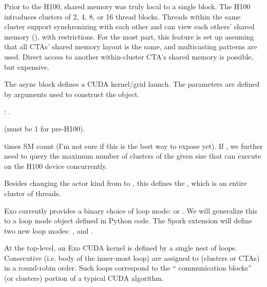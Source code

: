 \filbreak
{}

Prior to the H100, shared memory was truly local to a single block.
The H100 introduces clusters of 2, 4, 8, or 16 thread blocks.
Threads within the same cluster support synchronizing with each other and can view each others' shared memory (), with restrictions.
For the most part, this feature is set up assuming that all CTAs' shared memory layout is the same, and multicasting patterns are used.
Direct access to another within-cluster CTA's shared memory is possible, but expensive.

\filbreak
{}

The  async block defines a CUDA kernel/grid launch.
The parameters are defined by arguments used to construct the  object.

\filbreak
{}: .

\filbreak
{}  (must be 1 for pre-H100).

\filbreak
{}  times SM count (I'm not sure if this is the best way to expose  yet).
If , we further need to query the maximum number of clusters of the given size that can execute on the H100 device concurrently.

\filbreak
{} Besides changing the actor kind from  to , this defines the , which is an entire cluster of  threads.

\filbreak
{}

Exo currently provides a binary choice of loop mode:  or .
We will generalize this to a loop mode object defined in Python code.
The Spork extension will define two new loop modes: , and .

\filbreak
{} At the top-level, an Exo CUDA kernel is defined by a single nest of  loops.
Consecutive  (i.e. body of the inner-most  loop) are assigned to  (clusters or CTAs) in a round-robin order.
Such loops correspond to the `` communication  blocks'' (or clusters) portion of a typical CUDA algorithm.

